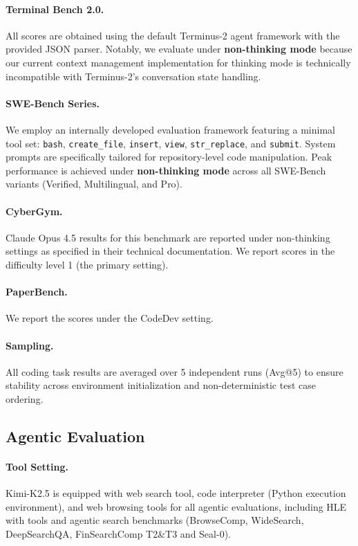 \documentclass{article}
\begin{document}
\paragraph{Terminal Bench 2.0.} All scores are obtained using the default Terminus-2 agent framework with the provided JSON parser. Notably, we evaluate under \textbf{non-thinking mode} because our current context management implementation for thinking mode is technically incompatible with Terminus-2's conversation state handling.

\paragraph{SWE-Bench Series.} We employ an internally developed evaluation framework featuring a minimal tool set: \texttt{bash}, \texttt{create\_file}, \texttt{insert}, \texttt{view}, \texttt{str\_replace}, and \texttt{submit}. System prompts are specifically tailored for repository-level code manipulation. Peak performance is achieved under \textbf{non-thinking mode} across all SWE-Bench variants (Verified, Multilingual, and Pro).

\paragraph{CyberGym.} Claude Opus 4.5 results for this benchmark are reported under non-thinking settings as specified in their technical documentation. We report scores in the difficulty level 1 (the primary setting).

\paragraph{PaperBench.} We report the scores under the CodeDev setting.

\paragraph{Sampling.} All coding task results are averaged over 5 independent runs (Avg@5) to ensure stability across environment initialization and non-deterministic test case ordering.

\subsection{Agentic Evaluation}
\label{app:eval_agentic}

\paragraph{Tool Setting.} Kimi-K2.5 is equipped with web search tool, code interpreter (Python execution environment), and web browsing tools for all agentic evaluations, including HLE with tools and agentic search benchmarks (BrowseComp, WideSearch, DeepSearchQA, FinSearchComp T2\&T3 and Seal-0).
\end{document}
